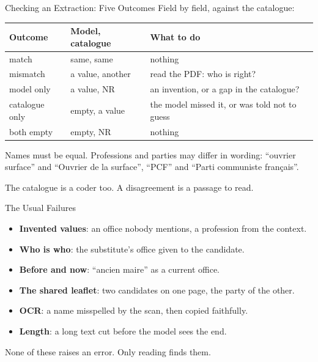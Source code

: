 \documentclass[svgnames,x11names,dvipsnames]{beamer}
\begin{document}
\begin{frame}{Checking an Extraction: Five Outcomes}
\small
Field by field, against the catalogue:

\vspace{0.3cm}
\renewcommand{\arraystretch}{1.4}
\footnotesize
\begin{tabular}{@{}>{\raggedright\arraybackslash}p{2.6cm}>{\raggedright\arraybackslash}p{2.4cm}>{\raggedright\arraybackslash}p{4.9cm}@{}}
\toprule
\textbf{Outcome} & \textbf{Model, catalogue} & \textbf{What to do} \\
\midrule
match & same, same & nothing \\
mismatch & a value, another & read the PDF: who is right? \\
model only & a value, NR & an invention, or a gap in the catalogue? \\
catalogue only & empty, a value & the model missed it, or was told not to guess \\
both empty & empty, NR & nothing \\
\bottomrule
\end{tabular}

\vspace{0.4cm}
\small
Names must be equal. Professions and parties may differ in wording: ``ouvrier surface'' and ``Ouvrier de la surface'', ``PCF'' and ``Parti communiste fran\c{c}ais''.

\vspace{0.2cm}
\centering
\alert{The catalogue is a coder too. A disagreement is a passage to read.}
\end{frame}

\begin{frame}{The Usual Failures}
\begin{itemize}
    \setlength{\itemsep}{7pt}
    \item \textbf{Invented values}: an office nobody mentions, a profession from the context.
    \item \textbf{Who is who}: the substitute's office given to the candidate.
    \item \textbf{Before and now}: ``ancien maire'' as a current office.
    \item \textbf{The shared leaflet}: two candidates on one page, the party of the other.
    \item \textbf{OCR}: a name misspelled by the scan, then copied faithfully.
    \item \textbf{Length}: a long text cut before the model sees the end.
\end{itemize}

\vspace{0.4cm}
\small
None of these raises an error. Only reading finds them.
\end{frame}
\end{document}
